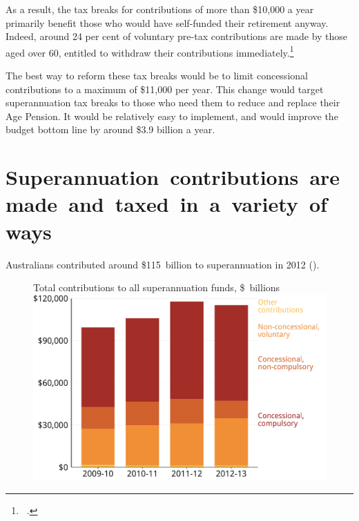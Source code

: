 As a result, the tax breaks for contributions of more than \$10,000 a year primarily benefit those who would have self-funded their retirement anyway. Indeed, around 24 per cent of voluntary pre-tax contributions are made by those aged over 60, entitled to withdraw their contributions immediately.\footnote{\gao\ \textcite{ATO2015SampleFile1213}.\DEVIATION{}} 

The best way to reform these tax breaks would be to limit concessional contributions to a maximum of \$11,000 per year. This change would target superannuation tax breaks to those who need them to reduce and replace their Age Pension. It would be relatively easy to implement, and would improve the budget bottom line by around \$3.9 billion a year.

\section{\mbox{Superannuation contributions are made and taxed in a variety of ways}}
Australians contributed around \$115~billion to superannuation in 2012 (). %


\begin{figure}
%
{Total contributions to all superannuation funds, \$\ billions}\label{fig:SUPER-4-1}
\includegraphics[width=\linewidth]{b5-super-atlas/Figure4-1-1.pdf}
\vspace{\baselineskip}
\end{figure}

